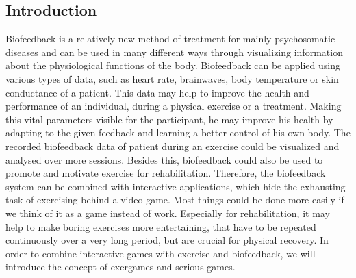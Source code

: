 \begin{multicols}{2}

\section{Introduction}

Biofeedback is a relatively new method of treatment for mainly psychosomatic diseases and can be used in many different ways through visualizing information about the physiological functions of the body. Biofeedback can be applied using various types of data, such as heart rate, brainwaves, body temperature or skin conductance of a patient. This data may help to improve the health and performance of an individual, during a physical exercise or a treatment. Making this vital parameters visible for the participant, he may improve his health by adapting to the given feedback and learning a better control of his own body. \cite[p. 12ff ]{Goe2010} The recorded biofeedback data of patient during an exercise could be visualized and analysed over more sessions. Besides this, biofeedback could also be used to promote and motivate exercise for rehabilitation. Therefore, the biofeedback system can be combined with interactive applications, which hide the exhausting task of exercising behind a video game. Most things could be done more easily if we think of it as a game instead of work. Especially for rehabilitation, it may help to make boring exercises more entertaining, that have to be repeated continuously over a very long
period, but are crucial for physical recovery. In order to combine interactive games with
exercise and biofeedback, we will introduce the concept of exergames and serious games.

\end{multicols}
